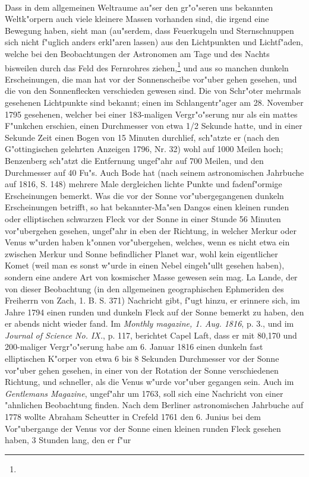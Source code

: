 \documentclass[a4paper, 11pt, oneside, polutonikogreek, german]{article}
\begin{document}
\paragraph{}
Dass in dem allgemeinen Weltraume au"ser den gr"o"seren uns bekannten Weltk"orpern auch viele kleinere Massen vorhanden sind, die irgend eine Bewegung haben, sieht man (au"serdem, dass Feuerkugeln und Sternschnuppen sich nicht f"uglich anders erkl"aren lassen) aus den Lichtpunkten und Lichtf"aden, welche bei den Beobachtungen der Astronomen am Tage und des Nachts bisweilen durch das Feld des Fernrohres ziehen,\footnote{} und aus so manchen dunkeln Erscheinungen, die man hat vor der Sonnenscheibe vor"uber gehen gesehen, und die von den Sonnenflecken verschieden gewesen sind. Die von Schr"oter mehrmals gesehenen Lichtpunkte sind bekannt; einen im Schlangentr"ager am 28. November 1795 gesehenen, welcher bei einer 183-maligen Vergr"o"serung nur als ein mattes F"unkchen erschien, einen Durchmesser von etwa 1/2 Sekunde hatte, und in einer Sekunde Zeit einen Bogen von 15 Minuten durchlief, sch"atzte er (nach den G"ottingischen gelehrten Anzeigen 1796, Nr. 32) wohl auf 1000 Meilen hoch; Benzenberg sch"atzt die Entfernung ungef"ahr auf 700 Meilen, und den Durchmesser auf 40 Fu"s. Auch Bode hat (nach seinem astronomischen Jahrbuche auf 1816, S. 148) mehrere Male dergleichen lichte Punkte und fadenf"ormige Erscheinungen bemerkt. Was die vor der Sonne vor"ubergegangenen dunkeln Erscheinungen betrifft, so hat bekannter-Ma"sen Dangos einen kleinen runden oder elliptischen schwarzen Fleck vor der Sonne in einer Stunde 56 Minuten vor"ubergehen gesehen, ungef"ahr in eben der Richtung, in welcher Merkur oder Venus w"urden haben k"onnen vor"ubergehen, welches, wenn es nicht etwa ein zwischen Merkur und Sonne befindlicher Planet war, wohl kein eigentlicher Komet (weil man es sonst w"urde in einen Nebel eingeh"ullt gesehen haben), sondern eine andere Art von kosmischer Masse gewesen sein mag. La Lande, der von dieser Beobachtung (in den allgemeinen geographischen Ephmeriden des Freiherrn von Zach, 1. B. S. 371) Nachricht gibt, f"ugt hinzu, er erinnere sich, im Jahre 1794 einen runden und dunkeln Fleck auf der Sonne bemerkt zu haben, den er abends nicht wieder fand. Im \emph{Monthly magazine, 1. Aug. 1816}, p. 3., und im \emph{Journal of Science No. IX.}, p. 117, berichtet Capel Laft, dass er mit 80,170 und 200-maliger Vergr"o"serung habe am 6. Januar 1816 einen dunkeln fast elliptischen K"orper von etwa 6 bis 8 Sekunden Durchmesser vor der Sonne vor"uber gehen gesehen, in einer von der Rotation der Sonne verschiedenen Richtung, und schneller, als die Venus w"urde vor"uber gegangen sein. Auch im \emph{Gentlemans Magazine}, ungef"ahr um 1763, soll sich eine Nachricht von einer "ahnlichen Beobachtung finden. Nach dem Berliner astronomischen Jahrbuche auf 1778 wollte Abraham Scheutter in Crefeld 1761 den 6. Junius bei dem Vor"ubergange der Venus vor der Sonne einen kleinen runden Fleck gesehen haben, 3 Stunden lang, den er f"ur 
\end{document}
